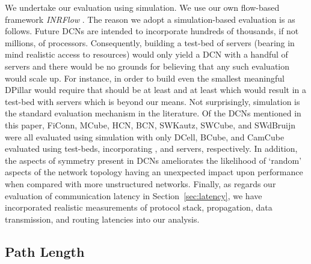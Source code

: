 \documentclass{article}
\begin{document}
We undertake our evaluation using simulation. We use our own flow-based framework \emph{INRFlow\/} \cite{INRFlow}. The reason we adopt a simulation-based evaluation is as follows. Future DCNs are intended to incorporate hundreds of thousands, if not millions, of processors. Consequently, building a test-bed of servers (bearing in mind realistic access to resources) would only yield a DCN with a handful of servers and there would be no grounds for believing that any such evaluation would scale up. For instance, in order to build even the smallest meaningful DPillar would require that  should be at least  and  at least  which would result in a test-bed with  servers which is beyond our means. Not surprisingly, simulation is the standard evaluation mechanism in the literature. Of the DCNs mentioned in this paper, FiConn, MCube, HCN, BCN, SWKautz, SWCube, and SWdBruijn were all evaluated using simulation with only DCell, BCube, and CamCube evaluated using test-beds, incorporating ,  and  servers, respectively. In addition, the aspects of symmetry present in DCNs ameliorates the likelihood of `random' aspects of the network topology having an unexpected impact upon performance when compared with more unstructured networks. Finally, as regards our evaluation of communication latency in Section~\ref{sec:latency}, we have incorporated realistic measurements of protocol stack, propagation, data transmission, and routing latencies into our analysis.

\subsection{Path Length}
\end{document}
